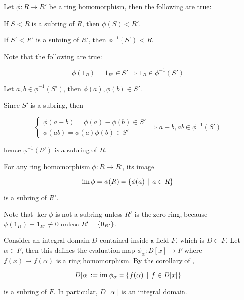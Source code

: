 \documentclass[a4paper,12pt]{article}
\begin{document}
\begin{pst}
  Let $\phi:R\to R'$ be a ring homomorphism, then the following are true:

  \begin{alist}
    \item If $S<R$ is a subring of $R$, then $\phi(S)<R'$.

    \item If $S'<R'$ is a subring of $R'$, then $\phi^{-1}(S')<R$.\n

    \prf Note that the following are true:

    \begin{rlist}
      \item

      $$\phi(1_{R})=1_{R'}\in S'\Rightarrow 1_{R}\in\phi^{-1}(S')$$

      \item Let $a,b\in\phi^{-1}(S')$, then $\phi(a),\phi(b)\in S'$.
    \end{rlist}

    Since $S'$ is a subring, then

    $$\begin{cases}
      \phi(a-b)=\phi(a)-\phi(b)\in S'\\
      \phi(ab)=\phi(a)\phi(b)\in S'
    \end{cases}\Rightarrow a-b,ab\in\phi^{-1}(S')$$\s

    hence $\phi^{-1}(S')$ is a subring of $R$.
  \end{alist}
\end{pst}\n

\begin{crl}
  For any ring homomorphism $\phi:R\to R'$, its image

  $$\mathrm{im}\:\phi=\phi(R)=\left\{ \phi(a)\,\mid\, a\in R\right\}$$\s

  is a subring of $R'$.
\end{crl}\n

Note that $\ker\phi$ is not a subring unless $R'$ is the zero ring, because $\phi(1_{R})=1_{R'}\neq 0$ unless $R'=\left\{ 0_{R'}\right\}$.\n

\begin{exm}
  Consider an integral domain $D$ contained inside a field $F$, which is $D\subset F$. Let $\alpha\in F$, then this defines the evaluation map $\phi_{\alpha}:D[x]\to F$ where $f(x)\mapsto f(\alpha)$ is a ring homomorphism. By the corollary of \rpst[\sctr{1}],

  $$D[\alpha]:=\mathrm{im}\:\phi_{\alpha}=\left\{ f(\alpha)\,\mid\, f\in D[x]\right\}$$\s

  is a subring of $F$. In particular, $D[\alpha]$ is an integral domain.
\end{exm}
\end{document}
